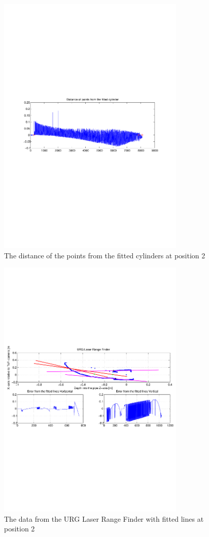 \begin{figure}[htbp]
    \centering
    \includegraphics[width=0.8\textwidth]{pics/pos21-control-tof-dist}
    \caption{The distance of the points from the fitted cylinders at position 2}
    \label{chap7:fig-pos21-control-tof-dits}
\end{figure}
\begin{figure}[htbp]
    \centering
    \includegraphics[width=0.8\textwidth]{pics/pos21-control-urg-2d}
    \caption{The data from the URG Laser Range Finder with fitted lines at position 2}
    \label{chap7:fig-pos21-control-urg-2d}
\end{figure}
